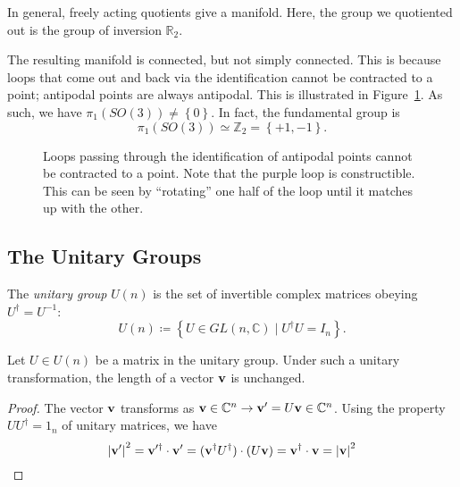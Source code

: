 \begin{example}[$SO(3)$]
  \begin{leftbar}
    \begin{remark}
      In general, freely acting quotients give a manifold. Here, the group we quotiented out is the group of inversion $\mathbb{R}_2$.
    \end{remark}
  \end{leftbar}

  The resulting manifold is connected, but not simply connected. This is because loops that come out and back via the identification cannot be contracted to a point; antipodal points are always antipodal. This is illustrated in Figure~\ref{fig:antipodal_loops}.
  As such, we have $\pi_1(SO(3)) \neq \left\{ 0 \right\}$. In fact, the fundamental group is
  \begin{equation}
    \label{eq:so3-fund}
    \pi_1(SO(3)) \simeq \mathbb{Z}_2 = \left\{ +1, -1 \right\}.
  \end{equation}
  \begin{figure}[bhtp]
    \centering
    \def\svgwidth{0.25\columnwidth}
    
    \caption{Loops passing through the identification of antipodal points cannot be contracted to a point. Note that the purple loop is constructible. This can be seen by ``rotating'' one half of the loop until it matches up with the other.}
    \label{fig:antipodal_loops}
  \end{figure}
\end{example}

\subsection*{The Unitary Groups}%

\begin{definition}
  The \emph{unitary group} $U(n)$ is the set of invertible complex matrices obeying $U^{\dagger} = U^{-1}$:
  \begin{equation}
    U(n) \coloneqq \left\{ U \in GL(n, \mathbb{C}) \mid U^{\dagger} U = I_n \right\}.
  \end{equation}
\end{definition}

\begin{claim}
  Let $U \in U(n)$ be a matrix in the unitary group. Under such a unitary transformation, the length of a vector $\vb{v}$ is unchanged.
\end{claim}
\begin{proof}
  The vector $\vb{v}$ transforms as \(\vb{v} \in \mathbb{C}^n \to \vb{v}' = U \vb{v} \in \mathbb{C}^n \).
  Using the property $U U^{\dagger} = 1_n$ of unitary matrices, we have
  \begin{equation}
    \abs{\vb{v}'}^2 = \vb{v}'^{\dagger} \cdot \vb{v}' = (\vb{v}^{\dagger} U^{\dagger}) \cdot (U \vb{v}) = \vb{v}^{\dagger} \cdot \vb{v} = \abs{\vb{v}}^2
  \end{equation}
\end{proof}

